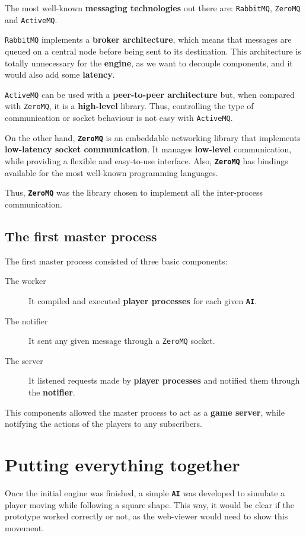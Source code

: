\documentclass[a4paper,11pt,titlepage,abstract,numbers=noenddot,automark,mnsy,intlimits,rgb,dvipsnames]{report}
\begin{document}
The most well-known \textbf{messaging technologies} out there are: \texttt{RabbitMQ}, \texttt{ZeroMQ} and \texttt{ActiveMQ}.

\texttt{RabbitMQ} implements
a \textbf{broker architecture}, which means that messages are queued on a central node before being sent to its destination.
This architecture is totally unnecessary for the \textbf{engine}, as we want to decouple components, and it would also add
some \textbf{latency}.

\texttt{ActiveMQ} can be used with a \textbf{peer-to-peer architecture} but, when compared with \texttt{ZeroMQ}, it is a
\textbf{high-level} library. Thus, controlling the type of communication or socket behaviour is not easy with \texttt{ActiveMQ}.

On the other hand, \textbf{\texttt{ZeroMQ}} \cite{zeromq} is an embeddable networking library that implements
\textbf{low-latency socket communication}. It manages \textbf{low-level} communication, while providing a flexible and easy-to-use interface.
Also, \textbf{\texttt{ZeroMQ}} has bindings available for the most well-known programming languages.

Thus, \textbf{\texttt{ZeroMQ}} was the library chosen to implement all the inter-process communication.
\subsection{The first master process}
The first master process consisted of three basic components:
\begin{description}
\item[The worker]
It compiled and executed \textbf{player processes} for each given \textbf{\texttt{AI}}.
\item[The notifier]
It sent any given message through a \texttt{ZeroMQ} socket.
\item[The server]
It listened requests made by \textbf{player processes} and notified them through the \textbf{notifier}.
\end{description}
This components allowed the master process to act as a \textbf{game server}, while notifying the actions of the players to any
subscribers.
\section{Putting everything together}
Once the initial engine was finished, a simple \textbf{\texttt{AI}} was developed to simulate a player moving
while following a square shape. This way, it would be clear if the prototype worked correctly or not, as the web-viewer would need
to show this movement.
\end{document}
